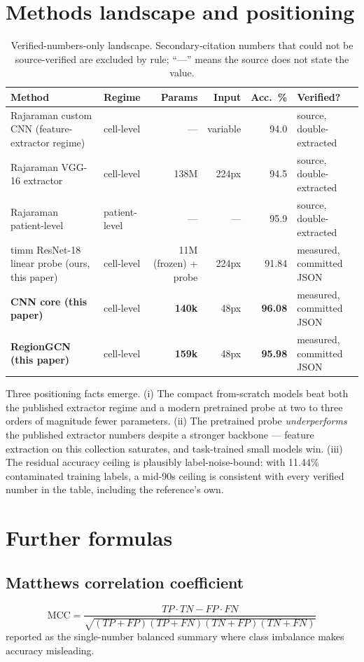 
\section{Methods landscape and positioning}
\begin{table}[h]\centering\small
\begin{tabular}{p{4.2cm} p{2.6cm} r r r l}
\hline
Method & Regime & Params & Input & Acc.\ \% & Verified? \\
\hline
Rajaraman custom CNN (feature-extractor regime) & cell-level & --- & variable & 94.0 & source, double-extracted \\
Rajaraman VGG-16 extractor & cell-level & 138M & 224px & 94.5 & source, double-extracted \\
Rajaraman patient-level & patient-level & --- & --- & 95.9 & source, double-extracted \\
timm ResNet-18 linear probe (ours, this paper) & cell-level & 11M (frozen) + probe & 224px & 91.84 & measured, committed JSON \\
\textbf{CNN core (this paper)} & cell-level & \textbf{140k} & 48px & \textbf{96.08} & measured, committed JSON \\
\textbf{RegionGCN (this paper)} & cell-level & \textbf{159k} & 48px & \textbf{95.98} & measured, committed JSON \\
\hline
\end{tabular}
\caption{Verified-numbers-only landscape. Secondary-citation numbers that
could not be source-verified are excluded by rule; ``---'' means the
source does not state the value.}
\label{tab:landscape}
\end{table}
Three positioning facts emerge. (i) The compact from-scratch models beat
both the published extractor regime and a modern pretrained probe at two
to three orders of magnitude fewer parameters. (ii) The pretrained probe
\emph{underperforms} the published extractor numbers despite a stronger
backbone --- feature extraction on this collection saturates, and
task-trained small models win. (iii) The residual accuracy ceiling is
plausibly label-noise-bound: with 11.44\% contaminated training labels,
a mid-90s ceiling is consistent with every verified number in the table,
including the reference's own.

\section{Further formulas}
\subsection{Matthews correlation coefficient}
\begin{equation}
\mathrm{MCC} = \frac{TP \cdot TN - FP \cdot FN}
{\sqrt{(TP+FP)(TP+FN)(TN+FP)(TN+FN)}}
\end{equation}
reported as the single-number balanced summary where class imbalance
makes accuracy misleading.
